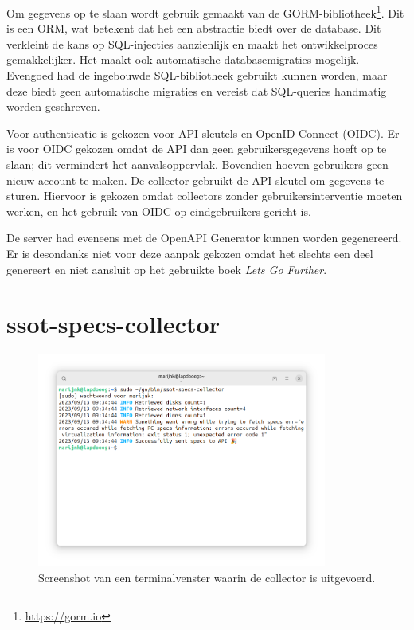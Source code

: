 \documentclass[../report.tex]{subfiles}
\begin{document}
Om gegevens op te slaan wordt gebruik gemaakt van de GORM-bibliotheek\footnote{\url{https://gorm.io}}. Dit is een \gls*{ORM}, wat betekent dat het een abstractie biedt over de database. Dit verkleint de kans op SQL-injecties aanzienlijk en maakt het ontwikkelproces gemakkelijker. Het maakt ook automatische databasemigraties mogelijk. Evengoed had de ingebouwde SQL-bibliotheek gebruikt kunnen worden, maar deze biedt geen automatische migraties en vereist dat SQL-queries handmatig worden geschreven.

Voor authenticatie is gekozen voor \glspl*{API-sleutel} en OpenID Connect (\gls*{OIDC}). Er is voor \gls*{OIDC} gekozen omdat de \gls*{API} dan geen gebruikersgegevens hoeft op te slaan; dit vermindert het aanvalsoppervlak. Bovendien hoeven gebruikers geen nieuw account te maken. De collector gebruikt de \gls*{API-sleutel} om gegevens te sturen. Hiervoor is gekozen omdat collectors zonder gebruikersinterventie moeten werken, en het gebruik van \gls*{OIDC} op eindgebruikers gericht is.

De \gls*{server} had eveneens met de \gls*{OpenAPI} Generator kunnen worden gegenereerd. Er is desondanks niet voor deze aanpak gekozen omdat het slechts een deel genereert en niet aansluit op het gebruikte boek \textit{Lets Go Further}.

\section{ssot-specs-collector}

\begin{figure}[ht]
  \centering
  \includegraphics[width=0.85\textwidth]{assets/images/ssot-specs-collector.png}
  \caption{Screenshot van een terminalvenster waarin de collector is uitgevoerd.}
  \label{fig:collector_screenshot}
\end{figure}
\end{document}

